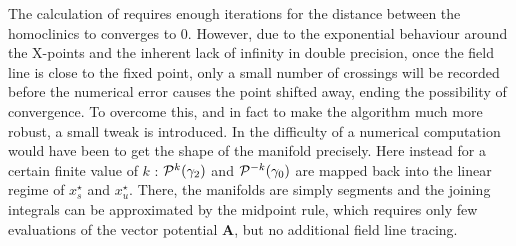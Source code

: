 The calculation of  requires enough iterations for the distance between the homoclinics to converges to 0. However, due to the exponential behaviour around the X-points and the inherent lack of infinity in double precision, once the field line is close to the fixed point, only a small number of crossings will be recorded before the numerical error causes the point shifted away, ending the possibility of convergence. To overcome this, and in fact to make the algorithm much more robust, a small tweak is introduced. In  the difficulty of a numerical computation would have been to get the shape of the manifold precisely. Here instead for a certain finite value of $k$ : $\mathcal{P}^k(\gamma_2)$ and $\mathcal{P}^{-k}(\gamma_0)$ are mapped back into the linear regime of $x_s^\star$ and $x_u^\star$. There, the manifolds are simply segments and the joining integrals can be approximated by the midpoint rule, which requires only few evaluations of the vector potential $\textbf{A}$, but no additional field line tracing.

